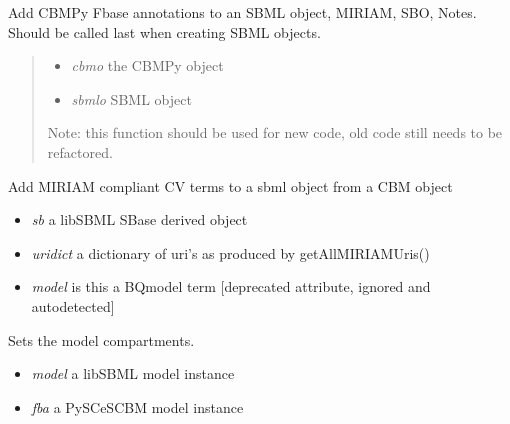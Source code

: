 \documentclass[a4paper,11pt,english]{sphinxmanual}
\begin{document}

\begin{fulllineitems}
\label{modules_doc:cbmpy.CBXML.sbml_setAnnotationsL3Fbc}
Add CBMPy Fbase annotations to an SBML object, MIRIAM, SBO, Notes. Should
be called last when creating SBML objects.
\begin{quote}
\begin{itemize}
\item {} 
\emph{cbmo} the CBMPy object

\item {} 
\emph{sbmlo} SBML object

\end{itemize}

Note: this function should be used for new code, old code still needs to be
refactored.
\end{quote}

\end{fulllineitems}


\begin{fulllineitems}
\label{modules_doc:cbmpy.CBXML.sbml_setCVterms}
Add MIRIAM compliant CV terms to a sbml object from a CBM object
\begin{itemize}
\item {} 
\emph{sb} a libSBML SBase derived object

\item {} 
\emph{uridict} a dictionary of uri's as produced by getAllMIRIAMUris()

\item {} 
\emph{model} is this a BQmodel term {[}deprecated attribute, ignored and autodetected{]}

\end{itemize}

\end{fulllineitems}


\begin{fulllineitems}
\label{modules_doc:cbmpy.CBXML.sbml_setCompartmentsL3}
Sets the model compartments.
\begin{itemize}
\item {} 
\emph{model} a libSBML model instance

\item {} 
\emph{fba} a PySCeSCBM model instance

\end{itemize}

\end{fulllineitems}
\end{document}

